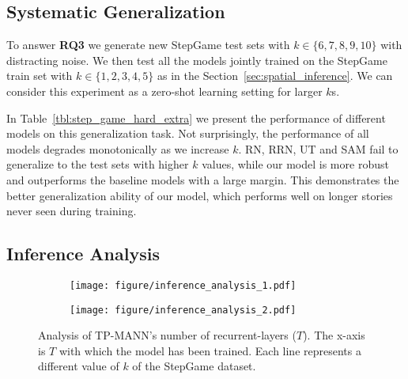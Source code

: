 \documentclass[letterpaper]{article} \usepackage{aaai22}  \usepackage{times}  \usepackage{helvet}  \usepackage{courier}  \usepackage[hyphens]{url}  \usepackage{graphicx} \urlstyle{rm} \def\UrlFont{\rm}  \usepackage{natbib}  \usepackage{caption} \DeclareCaptionStyle{ruled}{labelfont=normalfont,labelsep=colon,strut=off} \frenchspacing  \setlength{\pdfpagewidth}{8.5in}  \setlength{\pdfpageheight}{11in}  \usepackage{algorithm}
\begin{document}
\subsection{Systematic Generalization}

To answer \textbf{RQ3} 
we generate new StepGame test sets with $k \in \{6,7,8,9,10\}$ with distracting noise. 
We then test all the models jointly trained on the StepGame train set with $k \in \{1,2,3,4,5\}$ as in the Section~\ref{sec:spatial_inference}. We can consider this experiment as a zero-shot learning setting for larger $k$s. 

In Table~\ref{tbl:step_game_hard_extra} we present the performance of different models on this generalization task. Not surprisingly, the performance of all models degrades monotonically as we increase $k$. RN, RRN, UT and SAM fail to generalize to the test sets with higher $k$ values, while our model is more robust and outperforms the baseline models with a large margin. This demonstrates the better generalization ability of our model, which performs well on longer stories never seen during training. 

\subsection{Inference Analysis}




\begin{figure}[!t]
\centering
\begin{subfigure}
        \centering
        \texttt{[image: figure/inference\_analysis\_1.pdf]}
        \label{fig:sub1}
    \end{subfigure}
\begin{subfigure}
        \centering
        \texttt{[image: figure/inference\_analysis\_2.pdf]}
        \label{fig:sub2}
    \end{subfigure}
\caption{Analysis of TP-MANN's number of recurrent-layers ($T$). The x-axis is $T$ with which the model has been trained. Each line represents a different value of $k$ of the StepGame dataset.}
\label{fig:inference_analysis}
\end{figure}
\end{document}
